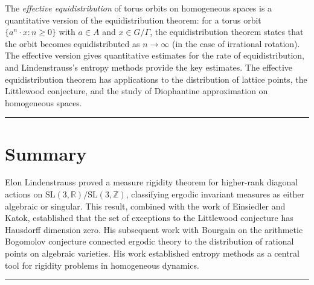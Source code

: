 The \emph{effective equidistribution} of torus orbits on homogeneous spaces is a quantitative version of the equidistribution theorem: for a torus orbit $\{a^n \cdot x : n \ge 0\}$ with $a \in A$ and $x \in G/\Gamma$, the equidistribution theorem states that the orbit becomes equidistributed as $n \to \infty$ (in the case of irrational rotation). The effective version gives quantitative estimates for the rate of equidistribution, and Lindenstrauss's entropy methods provide the key estimates. The effective equidistribution theorem has applications to the distribution of lattice points, the Littlewood conjecture, and the study of Diophantine approximation on homogeneous spaces.

\begin{center}\rule{0.5\linewidth}{0.5pt}\end{center}

\section*{Summary}

Elon Lindenstrauss proved a measure rigidity theorem for higher-rank diagonal actions on $\text{SL}(3,\mathbb{R})/\text{SL}(3,\mathbb{Z})$, classifying ergodic invariant measures as either algebraic or singular. This result, combined with the work of Einsiedler and Katok, established that the set of exceptions to the Littlewood conjecture has Hausdorff dimension zero. His subsequent work with Bourgain on the arithmetic Bogomolov conjecture connected ergodic theory to the distribution of rational points on algebraic varieties. His work established entropy methods as a central tool for rigidity problems in homogeneous dynamics.

\begin{center}\rule{0.5\linewidth}{0.5pt}\end{center}
